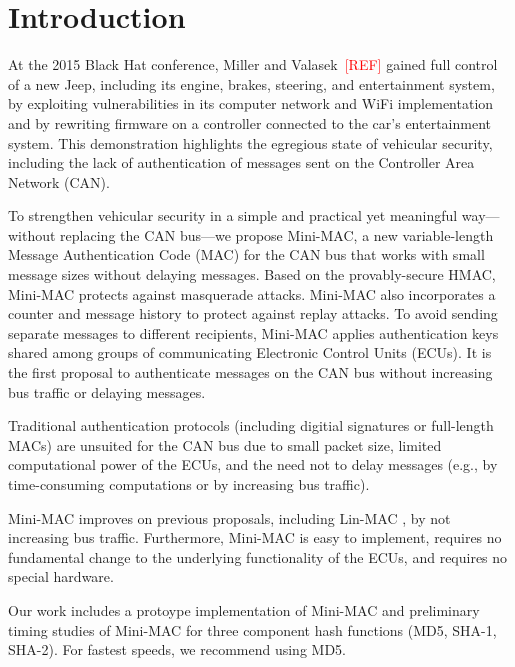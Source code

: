 \section{Introduction}

At the 2015 Black Hat conference, Miller and Valasek~\textcolor{red}{[REF]} gained full control of a new Jeep,
including its engine, brakes, steering, and entertainment system, by exploiting vulnerabilities in its
computer network and WiFi implementation and by rewriting firmware on a controller connected to the car's entertainment system.
This demonstration highlights the egregious state of vehicular security, including the lack of 
authentication of messages sent on the Controller Area Network (CAN).   


To strengthen vehicular security in a simple and practical 
yet meaningful way---without replacing the CAN bus---we propose Mini-MAC, 
a new variable-length Message Authentication Code (MAC)
for the CAN bus that works with small message sizes without delaying messages.  
Based on the provably-secure HMAC, Mini-MAC protects against masquerade attacks.  
Mini-MAC also incorporates a counter and message history to protect against replay attacks.
To avoid sending separate messages to different recipients, Mini-MAC applies authentication keys
shared among groups of communicating Electronic Control Units (ECUs).
It is the first proposal to authenticate messages on the CAN bus without increasing bus traffic
or delaying messages. 

Traditional authentication protocols (including digitial signatures or full-length MACs) are unsuited for the CAN bus due to
small packet size, limited computational power of the ECUs,
and the need not to delay messages (e.g., by time-consuming computations or by
increasing bus traffic).   

Mini-MAC improves on previous proposals, including Lin-MAC \cite{Lin-MAC}, by not increasing bus traffic.
Furthermore, Mini-MAC is easy to implement,
requires no fundamental change to the underlying functionality of the ECUs, and 
requires no special hardware.


Our work includes a protoype implementation of Mini-MAC and preliminary timing studies 
of Mini-MAC for three component hash functions (MD5, SHA-1, SHA-2).  For fastest speeds, 
we recommend using MD5.

